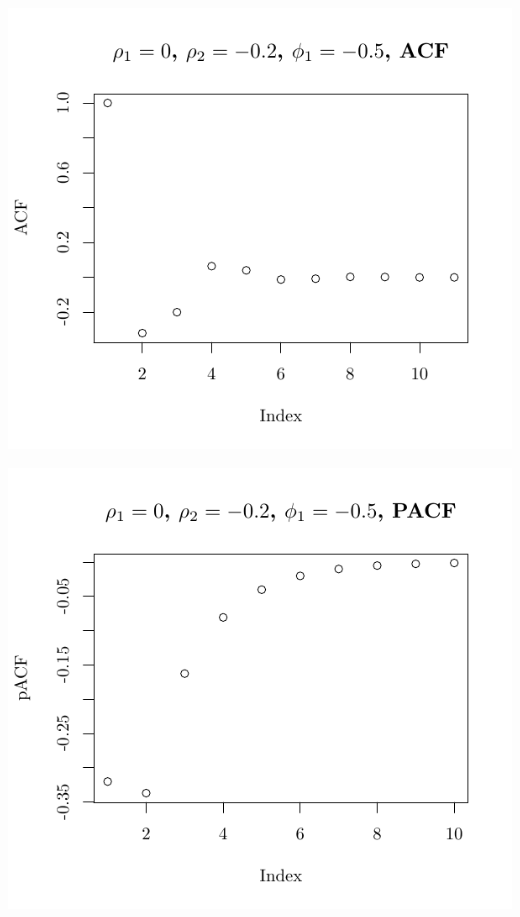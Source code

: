 \documentclass[10pt]{paper}\usepackage[]{graphicx}\usepackage[]{color}
\makeatletter
\def\maxwidth{ %
  \ifdim\Gin@nat@width>\linewidth
    \linewidth
  \else
    \Gin@nat@width
  \fi
}
\newenvironment{knitrout}{}{} %
\makeatother
\begin{document}
\begin{knitrout}
{\centering \includegraphics[width=\maxwidth]{figure/graphics-plotter-49} 

}




{\centering \includegraphics[width=\maxwidth]{figure/graphics-plotter-50} 

}





\end{knitrout}
\end{document}
